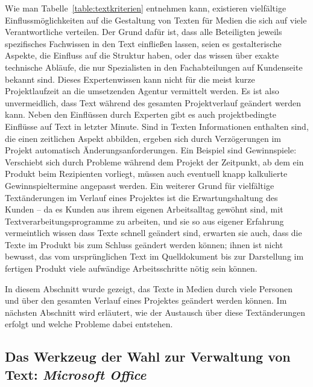 Wie man Tabelle~\ref{table:textkriterien} entnehmen kann, existieren vielfältige Einflussmöglichkeiten auf die Gestaltung von Texten für Medien die sich auf viele Verantwortliche verteilen. Der Grund dafür ist, dass alle Beteiligten jeweils spezifisches Fachwissen in den Text einfließen lassen, seien es gestalterische Aspekte, die Einfluss auf die Struktur haben, oder das wissen über exakte technische Abläufe, die nur Spezialisten in den Fachabteilungen auf Kundenseite bekannt sind. Dieses Expertenwissen kann nicht für die meist kurze Projektlaufzeit an die umsetzenden Agentur vermittelt werden. Es ist also unvermeidlich, dass Text während des gesamten Projektverlauf geändert werden kann. Neben den Einflüssen durch Experten gibt es auch projektbedingte Einflüsse auf Text in letzter Minute. Sind in Texten Informationen enthalten sind, die einen zeitlichen Aspekt abbilden, ergeben sich durch Verzögerungen im Projekt automatisch Änderungsanforderungen. Ein Beispiel sind Gewinnspiele: Verschiebt sich durch Probleme während dem Projekt der Zeitpunkt, ab dem ein Produkt beim Rezipienten vorliegt, müssen auch eventuell knapp kalkulierte Gewinnspieltermine angepasst werden. Ein weiterer Grund für vielfältige Textänderungen im Verlauf eines Projektes ist die Erwartungshaltung des Kunden – da es Kunden aus ihrem eigenen Arbeitsalltag gewöhnt sind, mit Textverarbeitungsprogramme zu arbeiten, und sie so aus eigener Erfahrung vermeintlich wissen dass Texte schnell geändert sind, erwarten sie auch, dass die Texte im Produkt bis zum Schluss geändert werden können; ihnen ist nicht bewusst, das vom ursprünglichen Text im Quelldokument bis zur Darstellung im fertigen Produkt viele aufwändige Arbeitsschritte nötig sein können.

\bigskip

In diesem Abschnitt wurde gezeigt, das Texte in Medien durch viele Personen und über den gesamten Verlauf eines Projektes geändert werden können. Im nächsten Abschnitt wird erläutert, wie der Austausch über diese Textänderungen erfolgt und welche Probleme dabei entstehen.

\subsection{Das Werkzeug der Wahl zur Verwaltung von Text: \emph{Microsoft Office}}

